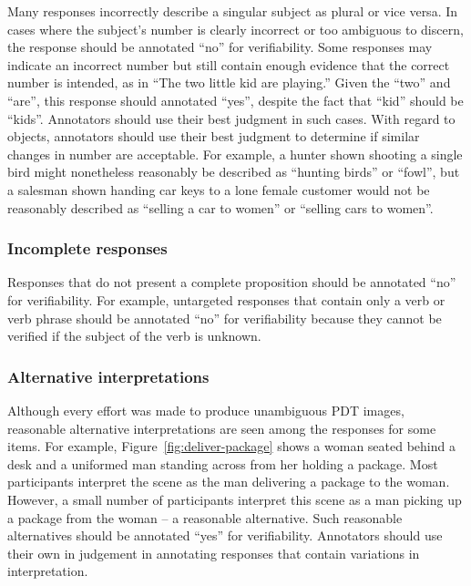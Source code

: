\documentclass[12pt,notitlepage]{article}
\begin{document}
Many responses incorrectly describe a singular subject as plural or vice versa. In cases where the subject's number is clearly incorrect or too ambiguous to discern, the response should be annotated ``no'' for verifiability. Some responses may indicate an incorrect number but still contain enough evidence that the correct number is intended, as in ``The two little kid are playing.'' Given the ``two'' and ``are'', this response should annotated ``yes'', despite the fact that ``kid'' should be ``kids''. Annotators should use their best judgment in such cases. With regard to objects, annotators should use their best judgment to determine if similar changes in number are acceptable. For example, a hunter shown shooting a single bird might nonetheless reasonably be described as ``hunting birds'' or ``fowl'', but a salesman shown handing car keys to a lone female customer would not be reasonably described as ``selling a car to women'' or ``selling cars to women''.

\subsubsection{Incomplete responses} Responses that do not present a complete proposition should be annotated ``no'' for verifiability. For example, untargeted responses that contain only a verb or verb phrase should be annotated ``no'' for verifiability because they cannot be verified if the subject of the verb is unknown.

\subsubsection{Alternative interpretations} Although every effort was made to produce unambiguous PDT images, reasonable alternative interpretations are seen among the responses for some items. For example, Figure~\ref{fig:deliver-package} shows a woman seated behind a desk and a uniformed man standing across from her holding a package. Most participants interpret the scene as the man delivering a package to the woman. However, a small number of participants interpret this scene as a man picking up a package from the woman -- a reasonable alternative. Such reasonable alternatives should be annotated ``yes'' for verifiability. Annotators should use their own in judgement in annotating responses that contain variations in interpretation.
\end{document}
